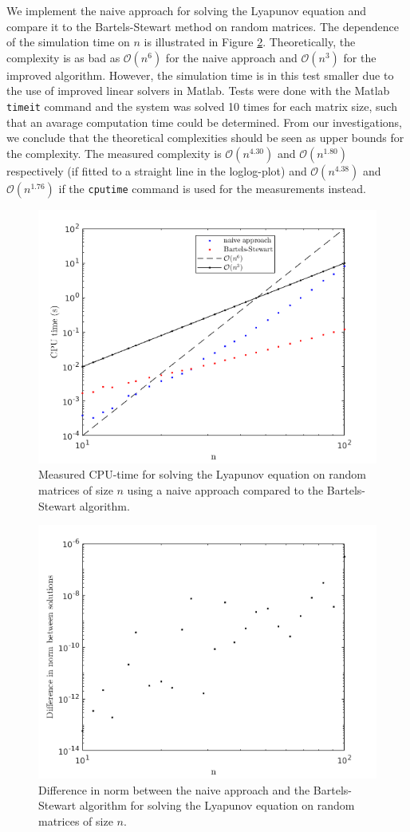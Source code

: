We implement the naive approach for solving the Lyapunov equation and compare it to the Bartels-Stewart method on random matrices. The dependence of the simulation time on $n$ is illustrated in Figure \ref{task1}. Theoretically, the complexity is as bad as $\mathcal O(n^6)$ for the naive approach and $\mathcal O(n^3)$ for the improved algorithm. However, the simulation time is in this test smaller due to the use of improved linear solvers in Matlab. Tests were done with the Matlab \texttt{timeit} command and the system was solved 10 times for each matrix size, such that an avarage computation time could be determined. From our investigations, we conclude that the theoretical complexities should be seen as upper bounds for the complexity. The measured complexity is $\mathcal O(n^{4.30})$ and $\mathcal O(n^{1.80})$  respectively (if fitted to a straight line in the loglog-plot) and $\mathcal O(n^{4.38})$ and $\mathcal O(n^{1.76})$ if the \texttt{cputime} command is used for the measurements instead.
\begin{figure}[h!]
\centering
\includegraphics[scale=0.5]{cpu.png}
\caption{Measured CPU-time for solving the Lyapunov equation on random matrices of size $n$ using a naive approach compared to the Bartels-Stewart algorithm.}
\label{task1}
\end{figure}

\begin{figure}[h!]
\centering
\includegraphics[scale=0.5]{norm.png}
\caption{Difference in norm between the naive approach and the Bartels-Stewart algorithm for solving the Lyapunov equation on random matrices of size $n$.}
\label{task1}
\end{figure}
